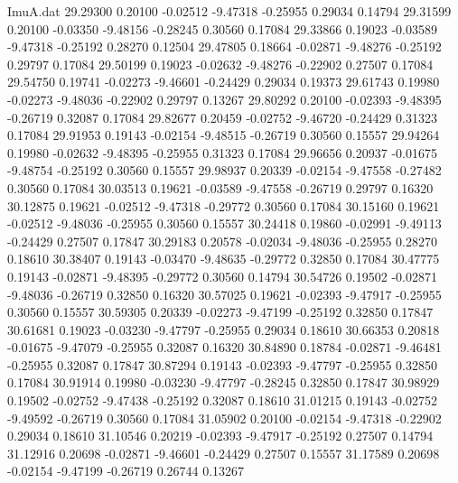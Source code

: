 \begin{filecontents}{ImuA.dat}
  29.29300    0.20100   -0.02512   -9.47318   -0.25955    0.29034    0.14794
  29.31599    0.20100   -0.03350   -9.48156   -0.28245    0.30560    0.17084
  29.33866    0.19023   -0.03589   -9.47318   -0.25192    0.28270    0.12504
  29.47805    0.18664   -0.02871   -9.48276   -0.25192    0.29797    0.17084
  29.50199    0.19023   -0.02632   -9.48276   -0.22902    0.27507    0.17084
  29.54750    0.19741   -0.02273   -9.46601   -0.24429    0.29034    0.19373
  29.61743    0.19980   -0.02273   -9.48036   -0.22902    0.29797    0.13267
  29.80292    0.20100   -0.02393   -9.48395   -0.26719    0.32087    0.17084
  29.82677    0.20459   -0.02752   -9.46720   -0.24429    0.31323    0.17084
  29.91953    0.19143   -0.02154   -9.48515   -0.26719    0.30560    0.15557
  29.94264    0.19980   -0.02632   -9.48395   -0.25955    0.31323    0.17084
  29.96656    0.20937   -0.01675   -9.48754   -0.25192    0.30560    0.15557
  29.98937    0.20339   -0.02154   -9.47558   -0.27482    0.30560    0.17084
  30.03513    0.19621   -0.03589   -9.47558   -0.26719    0.29797    0.16320
  30.12875    0.19621   -0.02512   -9.47318   -0.29772    0.30560    0.17084
  30.15160    0.19621   -0.02512   -9.48036   -0.25955    0.30560    0.15557
  30.24418    0.19860   -0.02991   -9.49113   -0.24429    0.27507    0.17847
  30.29183    0.20578   -0.02034   -9.48036   -0.25955    0.28270    0.18610
  30.38407    0.19143   -0.03470   -9.48635   -0.29772    0.32850    0.17084
  30.47775    0.19143   -0.02871   -9.48395   -0.29772    0.30560    0.14794
  30.54726    0.19502   -0.02871   -9.48036   -0.26719    0.32850    0.16320
  30.57025    0.19621   -0.02393   -9.47917   -0.25955    0.30560    0.15557
  30.59305    0.20339   -0.02273   -9.47199   -0.25192    0.32850    0.17847
  30.61681    0.19023   -0.03230   -9.47797   -0.25955    0.29034    0.18610
  30.66353    0.20818   -0.01675   -9.47079   -0.25955    0.32087    0.16320
  30.84890    0.18784   -0.02871   -9.46481   -0.25955    0.32087    0.17847
  30.87294    0.19143   -0.02393   -9.47797   -0.25955    0.32850    0.17084
  30.91914    0.19980   -0.03230   -9.47797   -0.28245    0.32850    0.17847
  30.98929    0.19502   -0.02752   -9.47438   -0.25192    0.32087    0.18610
  31.01215    0.19143   -0.02752   -9.49592   -0.26719    0.30560    0.17084
  31.05902    0.20100   -0.02154   -9.47318   -0.22902    0.29034    0.18610
  31.10546    0.20219   -0.02393   -9.47917   -0.25192    0.27507    0.14794
  31.12916    0.20698   -0.02871   -9.46601   -0.24429    0.27507    0.15557
  31.17589    0.20698   -0.02154   -9.47199   -0.26719    0.26744    0.13267

\end{filecontents}
